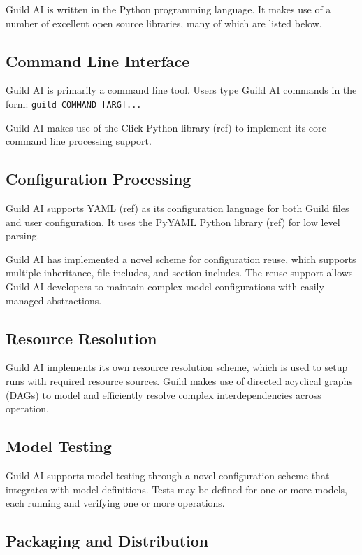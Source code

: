 \documentclass{article}
\begin{document}
Guild AI is written in the Python programming language. It makes use
of a number of excellent open source libraries, many of which are
listed below.

\subsection{Command Line Interface}

Guild AI is primarily a command line tool. Users type Guild AI
commands in the form: \verb|guild COMMAND [ARG]...|

Guild AI makes use of the Click Python library (ref) to implement its
core command line processing support.

\subsection{Configuration Processing}

Guild AI supports YAML (ref) as its configuration language for both
Guild files and user configuration. It uses the PyYAML Python library
(ref) for low level parsing.

Guild AI has implemented a novel scheme for configuration reuse, which
supports multiple inheritance, file includes, and section
includes. The reuse support allows Guild AI developers to maintain
complex model configurations with easily managed abstractions.

\subsection{Resource Resolution}

Guild AI implements its own resource resolution scheme, which is used
to setup runs with required resource sources. Guild makes use of
directed acyclical graphs (DAGs) to model and efficiently resolve
complex interdependencies across operation.

\subsection{Model Testing}

Guild AI supports model testing through a novel configuration scheme
that integrates with model definitions. Tests may be defined for one
or more models, each running and verifying one or more operations.

\subsection{Packaging and Distribution}
\end{document}
